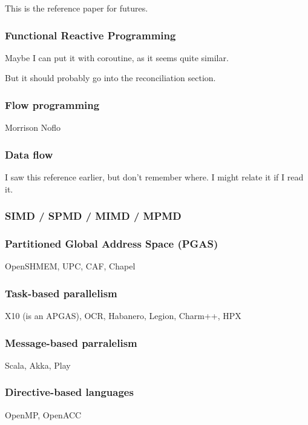This \cite{Jr1977} is the reference paper for futures.

\subsubsection{Functional Reactive Programming}

Maybe I can put it with coroutine, as it seems quite similar.

But it should probably go into the reconciliation section.

\subsubsection{Flow programming}
Morrison
Noflo

\subsubsection{Data flow}

I saw this reference earlier, but don't remember where. \cite{Kahn1974}
I might relate it if I read it.

\subsubsection{SIMD / SPMD / MIMD / MPMD}

\subsubsection{Partitioned Global Address Space (PGAS)}
OpenSHMEM, UPC, CAF, Chapel


\subsubsection{Task-based parallelism}
X10 (is an APGAS), OCR, Habanero, Legion, Charm++, HPX

\subsubsection{Message-based parralelism}
Scala, Akka, Play

\subsubsection{Directive-based languages}
OpenMP, OpenACC





